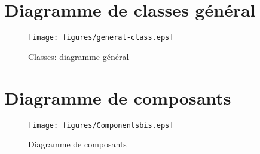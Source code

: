 \documentclass[a4paper, 11pt]{report}
\begin{document}
\chapter{Diagramme de classes général}
\begin{figure}[ht]
  \centering
  \texttt{[image: figures/general-class.eps]}
  \caption{\label{fig:Class:General} Classes: diagramme général}
\end{figure}

\chapter{Diagramme de composants}
\begin{figure}[ht]
  \centering
  \texttt{[image: figures/Componentsbis.eps]}
  \caption{\label{fig:CompleteComponents} Diagramme de composants}
\end{figure}

\printindex
\listoffigures
\end{document}
